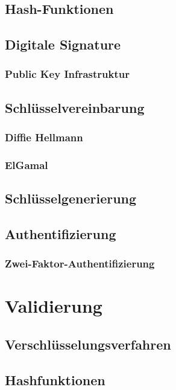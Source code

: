 \documentclass[10pt, a4paper]{scrreprt}
\begin{document}
\section{Hash-Funktionen}
\section{Digitale Signature}
\subsection{Public Key Infrastruktur}
\section{Schlüsselvereinbarung}
\subsection{Diffie Hellmann}
\subsection{ElGamal}
\section{Schlüsselgenerierung}
\section{Authentifizierung}
\subsection{Zwei-Faktor-Authentifizierung}


\chapter{Validierung}
\section{Verschlüsselungsverfahren}
\section{Hashfunktionen}
\end{document}
